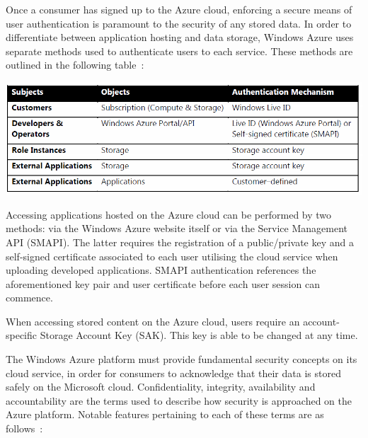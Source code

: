 Once a consumer has signed up to the Azure cloud, enforcing a secure means of user authentication is paramount to the security of any stored data. In order to differentiate between application hosting and data storage, Windows Azure uses separate methods used to authenticate users to each service. These methods are outlined in the following table~\cite{AzureSecurity}:

\begin{center}
\includegraphics[scale=0.6]{figs/AzureTable.png} \\
\end{center}

Accessing applications hosted on the Azure cloud can be performed by two methods: via the Windows Azure website itself or via the Service Management API (SMAPI). The latter requires the registration of a public/private key and a self-signed certificate associated to each user utilising the cloud service when uploading developed applications. SMAPI authentication references the aforementioned key pair and user certificate before each user session can commence.

When accessing stored content on the Azure cloud, users require an account-specific Storage Account Key (SAK). This key is able to be changed at any time.

The Windows Azure platform must provide fundamental security concepts on its cloud service, in order for consumers to acknowledge that their data is stored safely on the Microsoft cloud. Confidentiality, integrity, availability and accountability are the terms used to describe how security is approached on the Azure platform. Notable features pertaining to each of these terms are as follows~\cite{AzureSecurity}:

